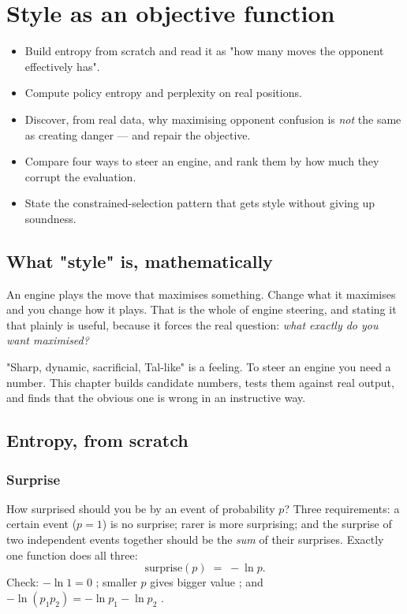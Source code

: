\chapter{Style as an objective function}
\label{ch:style}

\begin{objectives}
\begin{itemize}
\item Build entropy from scratch and read it as "how many moves the opponent effectively has".
\item Compute policy entropy and perplexity on real positions.
\item Discover, from real data, why maximising opponent confusion is \emph{not} the same as
  creating danger --- and repair the objective.
\item Compare four ways to steer an engine, and rank them by how much they corrupt the
  evaluation.
\item State the constrained-selection pattern that gets style without giving up soundness.
\end{itemize}
\end{objectives}

\section{What "style" is, mathematically}

An engine plays the move that maximises something. Change what it maximises and you change
how it plays. That is the whole of engine steering, and stating it that plainly is useful,
because it forces the real question: \emph{what exactly do you want maximised?}

"Sharp, dynamic, sacrificial, Tal-like" is a feeling. To steer an engine you need a number.
This chapter builds candidate numbers, tests them against real output, and finds that the
obvious one is wrong in an instructive way.

\section{Entropy, from scratch}

\subsection{Surprise}

How surprised should you be by an event of probability $p$? Three requirements: a certain
event ($p=1$) is no surprise; rarer is more surprising; and the surprise of two independent
events together should be the \emph{sum} of their surprises. Exactly one function does all
three:
\begin{equation}
  \label{eq:surprise}
  \text{surprise}(p) \;=\; -\ln p .
\end{equation}
Check: $-\ln 1 = 0$ \checkmark; smaller $p$ gives bigger value \checkmark; and
$-\ln(p_1p_2) = -\ln p_1 - \ln p_2$ \checkmark.

